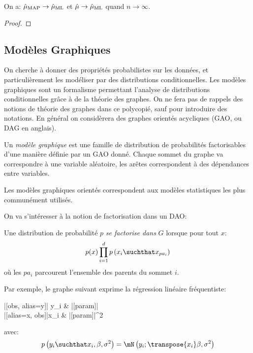 \documentclass[info, math, french]{mpb-cours}
\def\model#1#2{p\left(#1\suchthat#2\right)}
\def\define#1{\emph{\textcolor{vulm}{#1}}}
\def\plate#1#2#3{%
    \node[anchor=north east, yshift=-.1cm] (text) at (#2.south east) {#3};
  \begin{pgfonlayer}{bg}
    \draw[rounded corners, draw, fill=gray!1] let 
      \p1 = (text.south west),
      \p2 = (#2.south west),
      \p3 = (#1.north west),
      \p4 = (#1.north east),
      \p5 = (text.south east) in
      ({min(\x1, \x2, \x3, (\x4 - 1.3 * (width("#3"))))}, \y1) rectangle ({max(\x4, \x5) - 1pt}, \y4);
  \end{pgfonlayer}
}
\newcommand{\gmnode}[1]{%
    |[#1]|
}
\newenvironment{gmodel}[1]{
  \begin{category}[/tikz/execute at end picture={#1}]
}{
\end{category}
}
\begin{document}
\begin{proposition}
	On a: $\hat{\mu}_{\rm MAP} \to \hat{\mu}_{\rm ML}$ et $\hat{\mu} \to \hat{\mu}_{\rm ML}$ quand $n \to \infty$.
\end{proposition}
\begin{proof}

\end{proof}

\subsection{Modèles Graphiques}
On cherche à donner des propriétés probabilistes sur les données, et particulièrement les modéliser par des distributions conditionnelles.
Les modèles graphiques sont un formalisme permettant l'analyse de distributions conditionnelles grâce à de la théorie des graphes.
On ne fera pas de rappels des notions de théorie des graphes dans ce polycopié, sauf pour introduire des notations. En général on considèrera des graphes orientés acycliques (GAO, ou DAG en anglais).

\begin{definition}
	Un \define{modèle graphique} est une famille de distribution de probabilités factorisables d'une manière définie par un GAO donné.
	Chaque sommet du graphe va correspondre à une variable aléatoire, les arêtes correspondent à des dépendances entre variables.
\end{definition}
Les modèles graphiques orientés correspondent aux modèles statistiques les plus communément utilisés.

On va s'intéresser à la notion de factorisation dans un DAO:
\begin{definition}
	Une distribution de probabilité $p$ \define{se factorise dans} $G$ lorsque pour tout $x$:
	\begin{equation*}
		p(x) \prod_{i = 1}^{d}\model{x_{i}}{x_{pa_{i}}}
	\end{equation*}
	où les $pa_{i}$ parcourent l'ensemble des parents du sommet $i$.
\end{definition}

Par exemple, le graphe suivant exprime la régression linéaire fréquentiste:
\begin{gmodel}{\plate{y}{x}{$\forall i \leq n$}}
	\gmnode{obs, alias=y}y_{i} & |[param]|\beta\ar[l]\\
	|[alias=x, obs]|x_{i} \ar[u] &  |[param]|\sigma^{2} \ar[ul]
\end{gmodel}
avec:
\begin{equation*}
	\model{y_{i}}{x_{i}, \beta, \sigma^{2}} = \mN\left(y_{i}; \transpose{x_{i}}\beta, \sigma^{2}\right)
\end{equation*}
\end{document}
